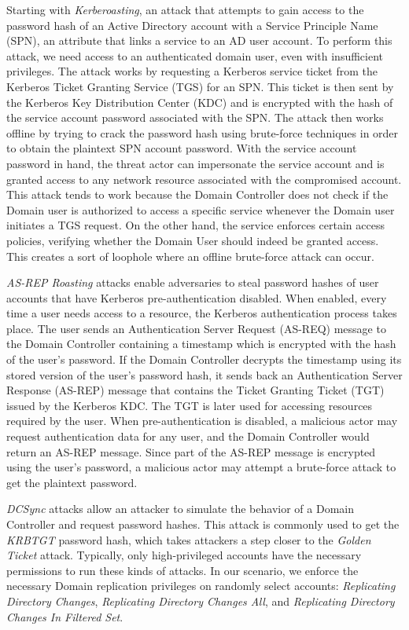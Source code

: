 Starting with \textit{Kerberoasting}, an attack that attempts to gain access to the password hash of an Active Directory account with a Service Principle Name (SPN), an attribute that links a service to an AD user account. To perform this attack, we need access to an authenticated domain user, even with insufficient privileges. The attack works by requesting a Kerberos service ticket from the Kerberos Ticket Granting Service (TGS) for an SPN. This ticket is then sent by the Kerberos Key Distribution Center (KDC) and is encrypted with the hash of the service account password associated with the SPN. The attack then works offline by trying to crack the password hash using brute-force techniques in order to obtain the plaintext SPN account password. With the service account password in hand, the threat actor can impersonate the service account and is granted access to any network resource associated with the compromised account. This attack tends to work because the Domain Controller does not check if the Domain user is authorized to access a specific service whenever the Domain user initiates a TGS request. On the other hand, the service enforces certain access policies, verifying whether the Domain User should indeed be granted access. This creates a sort of loophole where an offline brute-force attack can occur.

\textit{AS-REP Roasting} attacks enable adversaries to steal password hashes of user accounts that have Kerberos pre-authentication disabled. When enabled, every time a user needs access to a resource, the Kerberos authentication process takes place. The user sends an Authentication Server Request (AS-REQ) message to the Domain Controller containing a timestamp which is encrypted with the hash of the user's password. If the Domain Controller decrypts the timestamp using its stored version of the user's password hash, it sends back an Authentication Server Response (AS-REP) message that contains the Ticket Granting Ticket (TGT) issued by the Kerberos KDC. The TGT is later used for accessing resources required by the user. When pre-authentication is disabled, a malicious actor may request authentication data for any user, and the Domain Controller would return an AS-REP message. Since part of the AS-REP message is encrypted using the user's password, a malicious actor may attempt a brute-force attack to get the plaintext password. 

\textit{DCSync} attacks allow an attacker to simulate the behavior of a Domain Controller and request password hashes. This attack is commonly used to get the \textit{KRBTGT} password hash, which takes attackers a step closer to the \textit{Golden Ticket} attack. Typically, only high-privileged accounts have the necessary permissions to run these kinds of attacks. In our scenario, we enforce the necessary Domain replication privileges on randomly select accounts: \textit{Replicating Directory Changes}, \textit{Replicating Directory Changes All}, and \textit{Replicating Directory Changes In Filtered Set}.

